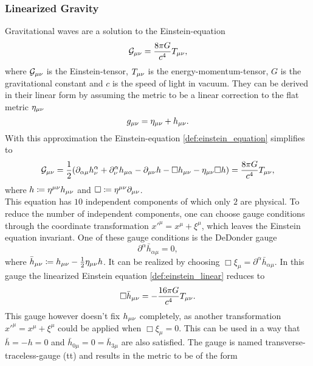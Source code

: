 \subsubsection{Linearized Gravity}\label{sec:linearized_gravity}
Gravitational waves are a solution to the Einstein-equation
\begin{equation}\label{def:einstein_equation}
\mathcal{G}_{\mu\nu} = \frac{8\pi G}{c^4}T_{\mu\nu},
\end{equation}
where $\mathcal{G}_{\mu\nu}$ is the Einstein-tensor, $T_{\mu\nu}$ is the energy-momentum-tensor, $G$ is the gravitational constant and $c$ is the speed of light in vacuum. They can be derived in their linear form by assuming the metric to be a linear correction to the flat metric $\eta_{\mu\nu}$
\begin{equation}\label{def:linear_approximation}
g_{\mu\nu} = \eta_{\mu\nu} + h_{\mu\nu}.
\end{equation}
With this approximation the Einstein-equation \eqref{def:einstein_equation} simplifies to
\begin{equation}\label{def:einstein_linear}
\mathcal{G}_{\mu\nu}=\frac{1}{2}{\left( \partial_{\alpha\mu}h^\alpha_\nu+\partial^\alpha_\nu h_{\mu\alpha} - \partial_{\mu\nu} h- \Box h_{\mu\nu} - \eta_{\mu\nu}\Box h \right)} = \frac{8\pi G}{c^4}T_{\mu\nu},
\end{equation}
where $h\coloneqq\eta^{\mu\nu} h_{\mu\nu}$ and $\Box\coloneqq\eta^{\mu\nu}\partial_{\mu\nu}$.\\
This equation has $10$ independent components of which only $2$ are physical. To reduce the number of independent components, one can choose gauge conditions through the coordinate transformation ${x'}^\mu=x^\mu+\xi^\mu$, which leaves the Einstein equation invariant. One of these gauge conditions is the DeDonder gauge
\begin{equation}
\partial^\alpha \bar{h}_{\alpha\mu} = 0,
\end{equation}
where $\bar{h}_{\mu\nu}\coloneqq h_{\mu\nu} - \frac{1}{2}\eta_{\mu\nu} h$. It can be realized by choosing $\Box\xi_\mu =\partial^\alpha \bar{h}_{\alpha\mu}$. In this gauge the linearized Einstein equation \eqref{def:einstein_linear} reduces to
\begin{equation}\label{def:gw_equation}
\Box\bar{h}_{\mu\nu}=-\frac{16\pi G}{c^4}T_{\mu\nu}.
\end{equation}
This gauge however doesn't fix $h_{\mu\nu}$ completely, as another transformation ${x'}^\mu=x^\mu+\xi^\mu$ could be applied when $\Box\xi_\mu =0$. This can be used in a way that $\bar{h}=-h=0$ and $\bar{h}_{0\mu} = 0 = \bar{h}_{3\mu}$ are also satisfied. The gauge is named transverse-traceless-gauge (\gls{tt}) and results in the metric to be of the form
